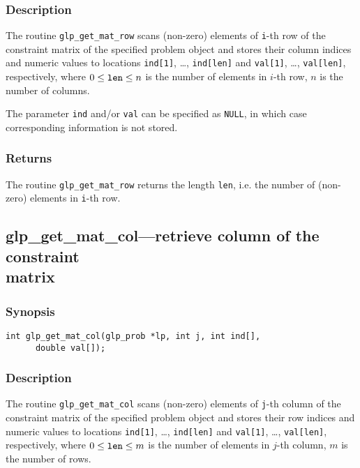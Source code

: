 \subsubsection*{Description}

The routine \verb|glp_get_mat_row| scans (non-zero) elements of
\verb|i|-th row of the constraint matrix of the specified problem object
and stores their column indices and numeric values to locations
\verb|ind[1]|, \dots, \verb|ind[len]| and \verb|val[1]|, \dots,
\verb|val[len]|, respectively, where $0\leq{\tt len}\leq n$ is the
number of elements in $i$-th row, $n$ is the number of columns.

The parameter \verb|ind| and/or \verb|val| can be specified as
\verb|NULL|, in which case corresponding information is not stored.

\subsubsection*{Returns}

The routine \verb|glp_get_mat_row| returns the length \verb|len|, i.e.
the number of (non-zero) elements in \verb|i|-th row.

\subsection{glp\_get\_mat\_col---retrieve column of the constraint\\
matrix}

\subsubsection*{Synopsis}

\begin{verbatim}
int glp_get_mat_col(glp_prob *lp, int j, int ind[],
      double val[]);
\end{verbatim}

\subsubsection*{Description}

The routine \verb|glp_get_mat_col| scans (non-zero) elements of
\verb|j|-th column of the constraint matrix of the specified problem
object and stores their row indices and numeric values to locations
\verb|ind[1]|, \dots, \verb|ind[len]| and \verb|val[1]|, \dots,
\verb|val[len]|, respectively, where $0\leq{\tt len}\leq m$ is the
number of elements in $j$-th column, $m$ is the number of rows.


